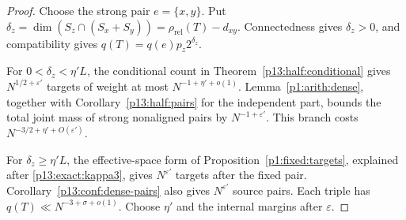 \begin{proof}
Choose the strong pair \(e=\{x,y\}\). Put
\(\delta_z=\dim(S_z\cap(S_x+S_y))
 =\rho_{\mathrm{rel}}(T)-d_{xy}\).
Connectedness gives \(\delta_z>0\), and compatibility gives
\(q(T)=q(e)p_z2^{\delta_z}\).

For \(0<\delta_z<\eta'L\), the conditional count
in Theorem~\ref{p13:half:conditional} gives
\(N^{1/2+\varepsilon'}\) targets of weight at most
\(N^{-1+\eta'+o(1)}\).
Lemma~\ref{p1:arith:dense}, together with
Corollary~\ref{p13:half:pairs} for the independent
part, bounds the total joint mass of strong nonaligned
pairs by \(N^{-1+\varepsilon'}\).
This branch costs \(N^{-3/2+\eta'+O(\varepsilon')}\).

For \(\delta_z\ge\eta'L\), the effective-space form of
Proposition~\ref{p1:fixed:targets}, explained after
\eqref{p13:exact:kappa3}, gives \(N^{\varepsilon'}\)
targets after the fixed pair.
Corollary~\ref{p13:conf:dense-pairs} also gives
\(N^{\varepsilon'}\) source pairs.
Each triple has \(q(T)\ll N^{-3+\sigma+o(1)}\).
Choose \(\eta'\) and the internal margins after
\(\varepsilon\).
\end{proof}
